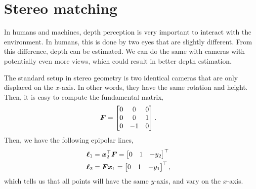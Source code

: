 \section{Stereo matching}

In humans and machines, depth perception is very important to interact with the
environment. In humans, this is done by two eyes that are slightly different.
From this difference, depth can be estimated. We can do the same with cameras
with potentially even more views, which could result in better depth
estimation.


The standard setup in stereo geometry is two identical cameras that are only
displaced on the $x$-axis. In other words, they have the same rotation and
height. Then, it is easy to compute the fundamental matrix, \[
  \bm{F} = \begin{bmatrix} 0 & 0 & 0 \\ 0 & 0 & 1 \\ 0 & -1 & 0 \end{bmatrix}
.\]
Then, we have the following epipolar lines,
\begin{align*}
  \bm{\ell}_1 &= \bm{x}_2^\top \bm{F} = \begin{bmatrix} 0 & 1 & -y_2 \end{bmatrix}^\top \\
  \bm{\ell}_2 &= \bm{F} \bm{x}_1 = \begin{bmatrix} 0 & 1 & -y_1 \end{bmatrix}^\top
,\end{align*}
which tells us that all points will have the same $y$-axis, and vary on the
$x$-axis.

